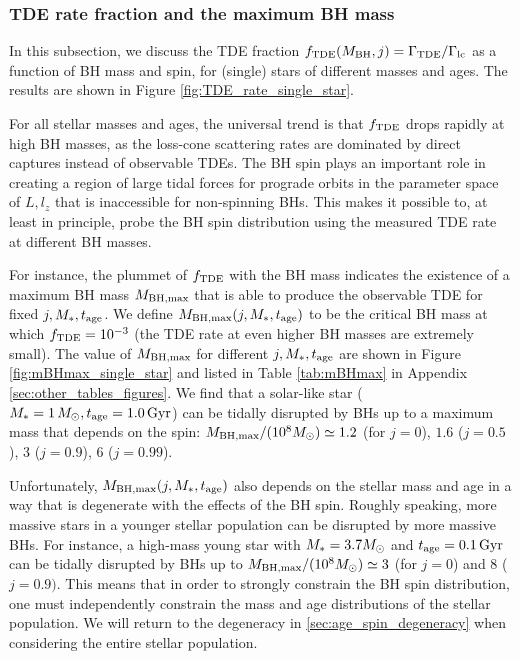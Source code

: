 \documentclass[useAMS,usenatbib]{mn2e}
\def\msun{M_{\rm \odot}}
\def\mstar{M_*}
\def\mBH{M_{\rm BH}}
\def\mBHmax{M_{\rm BH,\max}}
\def\GammaTDE{\Gamma_{\rm TDE}}
\def\Gammalc{\Gamma_{\rm lc}}
\def\fTDE{f_{\rm TDE}}
\def\tage{t_{\rm age}}
\def\Gyr{{\rm Gyr}}
\begin{document}
\subsubsection{TDE rate fraction and the maximum BH mass}

In this subsection, we discuss the TDE fraction $\fTDE(\mBH, j)=\GammaTDE/\Gammalc$ as a function of BH mass and spin, for (single) stars of different masses and ages. The results are shown in Figure  \ref{fig:TDE_rate_single_star}.

For all stellar masses and ages, the universal trend is that $\fTDE$ drops rapidly at high BH masses, as the loss-cone scattering rates are dominated by direct captures instead of observable TDEs. The BH spin plays an important role in creating a region of large tidal forces for prograde orbits in the parameter space of $L, l_z$ that is inaccessible for non-spinning BHs. This makes it possible to, at least in principle, probe the BH spin distribution using the measured TDE rate at different BH masses.

For instance, the plummet of $\fTDE$ with the BH mass indicates the existence of a maximum BH mass $\mBHmax$ that is able to produce the observable TDE for fixed $j,\mstar,\tage$. We define $\mBHmax(j, \mstar, \tage)$ to be the critical BH mass at which $\fTDE=10^{-3}$ (the TDE rate at even higher BH masses are extremely small). The value of $\mBHmax$ for different $j,\mstar,\tage$ are shown in Figure \ref{fig:mBHmax_single_star}  and listed in Table \ref{tab:mBHmax} in Appendix \ref{sec:other_tables_figures}. We find that a solar-like star ($\mstar=1\,\msun,\tage=1.0\,\Gyr$) can be tidally disrupted by BHs up to a maximum mass that depends on the spin: $\mBHmax/(10^8\msun)\simeq 1.2$ (for $j=0$), $1.6$ ($j=0.5$), $3$ ($j=0.9$), $6$ ($j=0.99$).

Unfortunately, $\mBHmax(j, \mstar, \tage)$ also depends on the stellar mass and age in a way that is degenerate with the effects of the BH spin. Roughly speaking, more massive stars in a younger stellar population can be disrupted by more massive BHs. For instance, a high-mass young star with $\mstar=3.7\msun$ and $\tage=0.1\,\rm Gyr$ can be tidally disrupted by BHs up to $\mBHmax/(10^8\msun)\simeq 3$ (for $j=0$) and $8$ ($j=0.9)$. This means that in order to strongly constrain the BH spin distribution, one must independently constrain the mass and age distributions of the stellar population. We will return to the degeneracy in \ref{sec:age_spin_degeneracy} when considering the entire stellar population.
\end{document}

